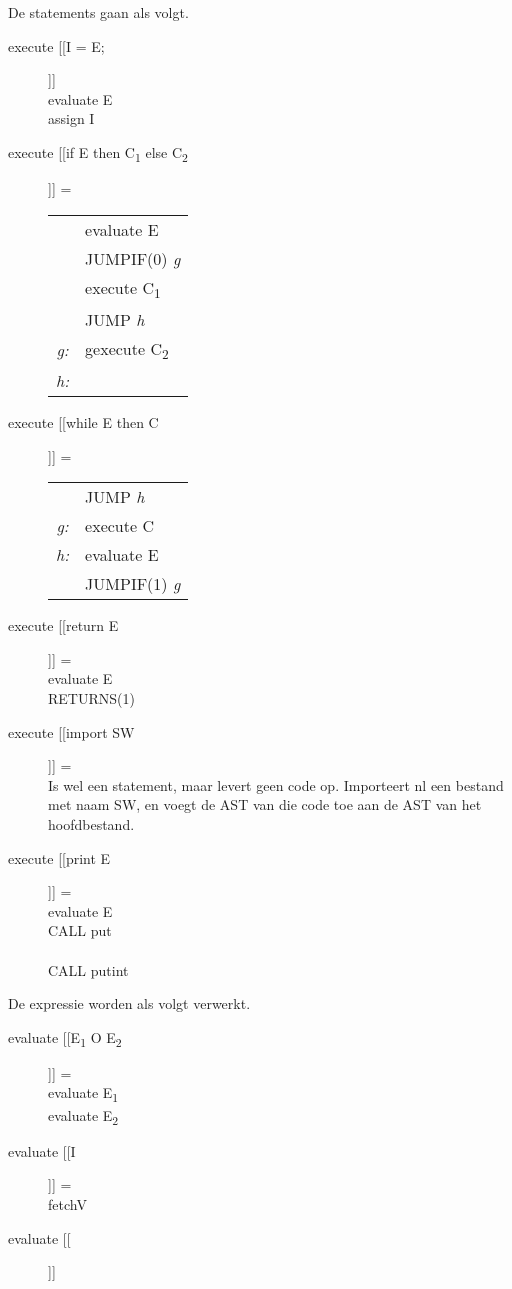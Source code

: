 De statements gaan als volgt.
\begin{description}
    \item[execute [[I = E;]]] \hfill \\
        evaluate E \\
        assign I
    \item[execute [[if E then C\textsubscript{1} else C\textsubscript{2}]]] = \hfill \\
        \begin{tabular}{c l}
            &evaluate E \\
            &JUMPIF(0) \emph{g} \\
            &execute C\textsubscript{1} \\
            &JUMP \emph{h} \\
    \emph{g:}&gexecute C\textsubscript{2} \\
    \emph{h:}& \\
        \end{tabular}
    \item[execute [[while E then C]]] = \hfill \\
        \begin{tabular}{c l}
            &JUMP \emph{h} \\
    \emph{g:}&execute C \\
    \emph{h:}&evaluate E \\
            &JUMPIF(1) \emph{g} \\
        \end{tabular} 
    \item[execute [[return E]]]  = \hfill \\
        evaluate E \\
        RETURNS(1)
    \item[execute [[import SW]]] = \hfill \\ 
        Is wel een statement, maar levert geen code op. Importeert nl een bestand met naam SW, en voegt de AST van die code toe aan de AST van het hoofdbestand.
    \item[execute [[print E]]] = \hfill \\
        evaluate E \\
        CALL put \\
         \\
        CALL putint
\end{description}

De expressie worden als volgt verwerkt.
\begin{description}
    \item[evaluate [[E\textsubscript{1} O E\textsubscript{2}]]] = \hfill \\
        evaluate E\textsubscript{1} \\
        evaluate E\textsubscript{2} \\
    \item[evaluate [[I]]] = \hfill \\
        fetchV
    \item[evaluate [[]]] 
\end{description}

